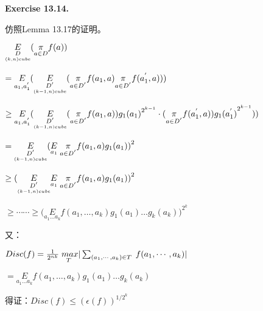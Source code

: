\documentclass[a4paper]{article}
\newenvironment{exercise}[1]{
	\par
	\noindent\textbf{Exercise #1.}\quad
}{
	\par
	\bigskip
}
\begin{document}
	\begin{exercise}{13.14}
		仿照Lemma 13.17的证明。
		
			$\underset{\underset{(k,n)cube}D}E(\underset{a\in D}\pi f(a))\\$
			
			$=\underset{a_1,a_1^{'}}E(\underset{\underset{(k-1,n)cube}{D^{'}}}E(\underset{a\in D^{'}}\pi f(a_1,a)\underset{a\in D^{'}}\pi f(a_1^{'},a)))\\$
			
			$\geq\underset{a_1,a_1^{'}}E(\underset{\underset{(k-1,n)cube}{D^{'}}}E(\underset{a\in D^{'}}\pi f(a_1,a))g_1{(a_1)}^{2^{k-1}}\cdot(\underset{a\in D^{'}}\pi f(a_1^{'},a))g_1{(a_1^{'})}^{2^{k-1}}))\\$
			
			$=\underset{\underset{(k-1,n)cube}{D^{'}}}E(\underset{a_1}E\;\underset{a\in D^{'}}\pi f(a_1,a)g_1{{(a_1)})}^2\\$
			
			$\geq(\underset{\underset{(k-1,n)cube}{D^{'}}}E\underset{a_1}E\;\underset{a\in D^{'}}\pi f(a_1,a)g_1{{(a_1)})}^2\\$
			
			$\geq\cdots\cdots\geqslant(\underset{a_1\dots a_k}Ef(a_1,\dots,a_k)g_1{(a_1)}\dots g_k{{(a_k)})}^{2^k}$
		
		又：
		
			$Disc(f)=\frac1{2^{nk}}\underset T{\;max}\vert\sum_{(a_1,\cdots,a_k)\in T}\;f(a_1,\cdots,a_k)\vert\\$
			
			$=\underset{a_1\dots a_k}Ef(a_1,\dots,a_k)g_1{(a_1)}\dots g_k{(a_k)}$
			
		得证：$Disc(f)\leq(\epsilon(f))^{1/{2^k}}$
		
	\end{exercise}
\end{document}
